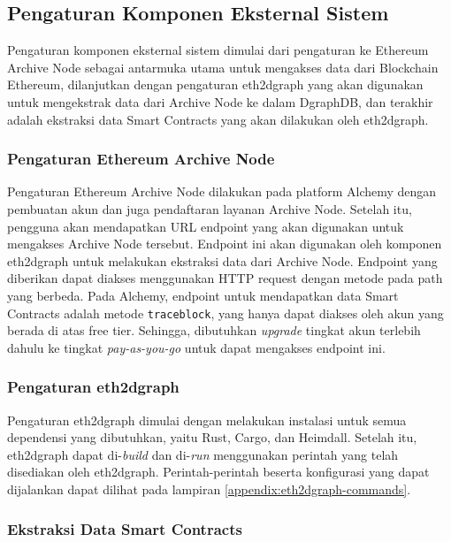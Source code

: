 \subsection{Pengaturan Komponen Eksternal Sistem}

Pengaturan komponen eksternal sistem dimulai dari pengaturan ke Ethereum Archive Node sebagai antarmuka utama untuk mengakses data dari Blockchain Ethereum, dilanjutkan dengan pengaturan eth2dgraph yang akan digunakan untuk mengekstrak data dari Archive Node ke dalam DgraphDB, dan terakhir adalah ekstraksi data Smart Contracts yang akan dilakukan oleh eth2dgraph.

\subsubsection{Pengaturan Ethereum Archive Node}

Pengaturan Ethereum Archive Node dilakukan pada platform Alchemy dengan pembuatan akun dan juga pendaftaran layanan Archive Node. Setelah itu, pengguna akan mendapatkan URL endpoint yang akan digunakan untuk mengakses Archive Node tersebut. Endpoint ini akan digunakan oleh komponen eth2dgraph untuk melakukan ekstraksi data dari Archive Node. Endpoint yang diberikan dapat diakses menggunakan HTTP request dengan metode pada path yang berbeda. Pada Alchemy, endpoint untuk mendapatkan data Smart Contracts adalah metode \texttt{trace\textunderscore block}, yang hanya dapat diakses oleh akun yang berada di atas free tier. Sehingga, dibutuhkan \textit{upgrade} tingkat akun terlebih dahulu ke tingkat \textit{pay-as-you-go} untuk dapat mengakses endpoint ini.

\subsubsection{Pengaturan eth2dgraph}

Pengaturan eth2dgraph dimulai dengan melakukan instalasi untuk semua dependensi yang dibutuhkan, yaitu Rust, Cargo, dan Heimdall. Setelah itu, eth2dgraph dapat di-\textit{build} dan di-\textit{run} menggunakan perintah yang telah disediakan oleh eth2dgraph. Perintah-perintah beserta konfigurasi yang dapat dijalankan dapat dilihat pada lampiran \ref{appendix:eth2dgraph-commands}.

\subsubsection{Ekstraksi Data Smart Contracts}

